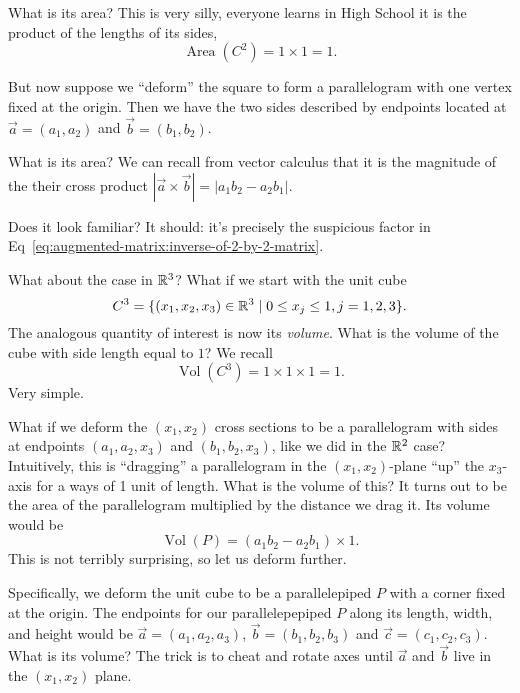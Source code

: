 What is its area? This is very silly, everyone learns in High School it
is the product of the lengths of its sides,
\begin{equation}
\operatorname{Area}(C^{2})=1\times1=1.
\end{equation}

But now suppose we ``deform'' the square to form a parallelogram with
one vertex fixed at the origin. Then we have the two sides described by
endpoints located at $\vec{a}=(a_{1},a_{2})$ and
$\vec{b}=(b_{1},b_{2})$.

What is its area? We can recall from vector
calculus that it is the magnitude of the their cross product
$|\vec{a}\times\vec{b}|=|a_{1}b_{2}-a_{2}b_{1}|$.

Does it look familiar? It should: it's precisely the suspicious factor
in Eq~\eqref{eq:augmented-matrix:inverse-of-2-by-2-matrix}.

\M What about the case in $\mathbb{R}^{3}$? What if we start with the unit cube
\begin{equation}
C^{3} = \{(x_{1},x_{2},x_{3})\in\mathbb{R}^{3}\mid 0\leq x_{j}\leq 1, j=1,2,3\}.
\end{equation}
The analogous quantity of interest is now its \emph{volume}. What is the
volume of the cube with side length equal to $1$? We recall
\begin{equation}
\operatorname{Vol}(C^{3})=1\times1\times1=1.
\end{equation}
Very simple.

What if we deform the $(x_{1},x_{2})$ cross sections to be a
parallelogram with sides at endpoints $(a_{1},a_{2},x_{3})$ and
$(b_{1},b_{2},x_{3})$, like we did in the $\mathbb{R}^{2}$ case? Intuitively, this is
``dragging'' a parallelogram in the $(x_{1},x_{2})$-plane ``up'' the
$x_{3}$-axis for a ways of 1 unit of length. What is the volume of this?
It turns out to be the area of the parallelogram multiplied by the
distance we drag it. Its volume would be
\begin{equation}
\operatorname{Vol}(P) = (a_{1}b_{2}-a_{2}b_{1})\times 1.
\end{equation}
This is not terribly surprising, so let us deform further.

Specifically, we deform the unit cube to be a parallelepiped $P$ with a
corner fixed at the origin. The endpoints for our parallelepepiped $P$ along
its length, width, and height would be $\vec{a}=(a_{1},a_{2},a_{3})$,
$\vec{b}=(b_{1},b_{2},b_{3})$ and $\vec{c}=(c_{1},c_{2},c_{3})$. What is
its volume? The trick is to cheat and rotate axes until $\vec{a}$ and
$\vec{b}$ live in the $(x_{1},x_{2})$ plane.

